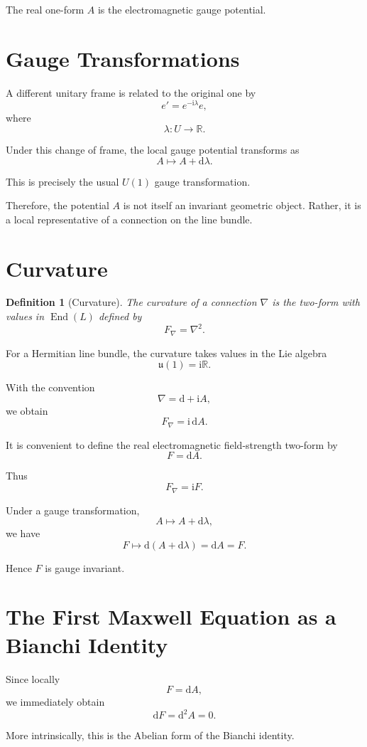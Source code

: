 \documentclass[11pt,a4paper]{article}
\newtheorem{definition}{Definition}[section]
\newcommand{\R}{\mathbb{R}}
\newcommand{\ii}{\mathrm{i}}
\newcommand{\dd}{\mathrm{d}}
\newcommand{\End}{\operatorname{End}}
\begin{document}
The real one-form $A$ is the electromagnetic gauge potential.

\section{Gauge Transformations}

A different unitary frame is related to the original one by
\[
e'
=
e^{-\ii\lambda}e,
\]
where
\[
\lambda:U\longrightarrow\R.
\]

Under this change of frame, the local gauge potential transforms as
\[
A
\longmapsto
A+\dd\lambda.
\]

This is precisely the usual $U(1)$ gauge transformation.

Therefore, the potential $A$ is not itself an invariant geometric
object. Rather, it is a local representative of a connection on
the line bundle.

\section{Curvature}

\begin{definition}[Curvature]
The curvature of a connection $\nabla$ is the two-form with values
in $\End(L)$ defined by
\[
F_\nabla
=
\nabla^2.
\]
\end{definition}

For a Hermitian line bundle, the curvature takes values in the Lie
algebra
\[
\mathfrak{u}(1)=\ii\R.
\]

With the convention
\[
\nabla=\dd+\ii A,
\]
we obtain
\[
F_\nabla
=
\ii\,\dd A.
\]

It is convenient to define the real electromagnetic field-strength
two-form by
\[
F=\dd A.
\]

Thus
\[
F_\nabla=\ii F.
\]

Under a gauge transformation,
\[
A\mapsto A+\dd\lambda,
\]
we have
\[
F
\mapsto
\dd(A+\dd\lambda)
=
\dd A
=
F.
\]

Hence $F$ is gauge invariant.

\section{The First Maxwell Equation as a Bianchi Identity}

Since locally
\[
F=\dd A,
\]
we immediately obtain
\[
\dd F
=
\dd^2A
=
0.
\]

More intrinsically, this is the Abelian form of the Bianchi identity.
\end{document}
